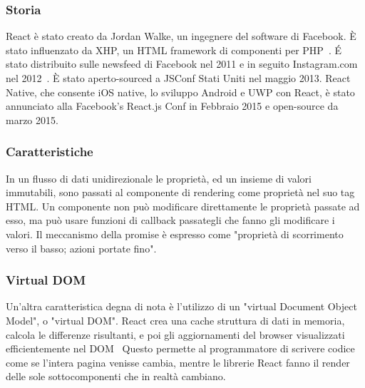 \subsubsection{Storia}
React è stato creato da Jordan Walke, un ingegnere del software di Facebook. \`E stato influenzato da XHP, un HTML
framework di componenti per PHP~\cite{quora}. \'E stato distribuito sulle newsfeed di Facebook nel 2011 e in seguito
Instagram.com nel 2012~\cite{txjs}. \`E stato aperto-sourced a JSConf Stati Uniti nel maggio 2013.
React Native, che consente iOS native, lo sviluppo Android e UWP con React, è stato annunciato
alla Facebook's React.js Conf in Febbraio 2015 e open-source da marzo 2015.


\subsubsection{Caratteristiche}
In un flusso di dati unidirezionale le propriet\`a, ed un insieme di valori immutabili, sono passati al
componente di rendering come propriet\`a nel suo tag HTML.
Un componente non pu\`o modificare direttamente le propriet\`a passate ad esso, ma pu\`o usare funzioni di
callback passategli che fanno gli modificare i valori.
Il meccanismo della promise \`e espresso come "proprietà di scorrimento verso il basso; azioni portate fino".

\subsubsection{Virtual DOM}
Un'altra caratteristica degna di nota è l'utilizzo di un "virtual Document Object Model", o "virtual DOM".
React crea una cache struttura di dati in memoria, calcola le differenze risultanti, e poi gli aggiornamenti
del browser visualizzati efficientemente nel DOM~\cite{reactdom} Questo permette al programmatore di scrivere codice come se
l'intera pagina venisse cambia, mentre le librerie React fanno il render delle sole sottocomponenti che in realtà cambiano.

